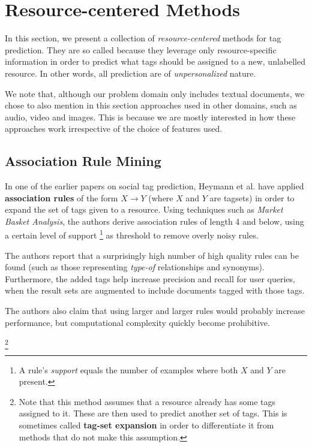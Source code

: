 \section{Resource-centered Methods}\label{section:resource_centered_methods}

In this section, we present a collection of  \textit{resource-centered} methods for tag prediction. They are so called because they leverage only resource-specific information in order to predict what tags should be assigned to a new, unlabelled resource. In other words, all prediction are of \textit{unpersonalized} nature.

We note that, although our problem domain only includes textual documents, we chose to also mention in this section approaches used in other domains, such as audio, video and images. This is because we are mostly interested in how these approaches work irrespective of the choice of features used.

\subsection{Association Rule Mining}


In one of the earlier papers on social tag prediction, Heymann et al. \citeyearpar{heymann_etal_2008} have applied \textbf{association rules} of the form $X \rightarrow Y$ (where $X$ and $Y$ are tagsets) in order to expand the set of tags given to a resource. Using techniques such as \textit{Market Basket Analysis}, the authors derive association rules of length 4 and below, using a certain level of support \footnote{A rule's \textit{support} equals the number of examples where both $X$ and $Y$ are present.} as threshold to remove overly noisy rules.

The authors report \citep{heymann_etal_2008} that a surprisingly high number of high quality rules can be found (such as those representing \textit{type-of} relationships and synonyms). Furthermore, the added tags help increase precision and recall for user queries, when the result sets are augmented to include documents tagged with those tags.

The authors also claim that using larger and larger rules would probably increase performance, but computational complexity quickly become prohibitive.

\footnote{Note that this method assumes that a resource already has some tags assigned to it. These are then used to predict another set of tags. This is sometimes called \textbf{tag-set expansion} in order to differentiate it from methods that do not make this assumption.}


